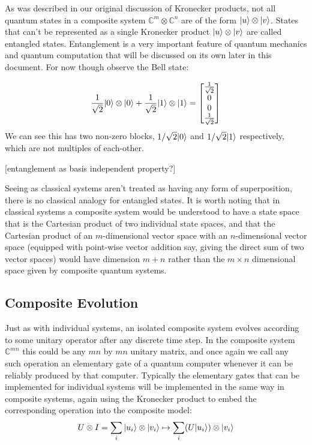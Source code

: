 As was described in our original discussion of Kronecker products, not all quantum states in a composite system $\mathbb{C}^m\otimes\mathbb{C}^n$ are of the form $| u \rangle\otimes| v \rangle$. States that can't be represented as a single Kronecker product $| u \rangle\otimes| v \rangle$ are called entangled states. Entanglement is a very important feature of quantum mechanics and quantum computation that will be discussed on its own later in this document. For now though observe the Bell state:

\[\frac{1}{\sqrt{2}}| 0 \rangle\otimes| 0 \rangle + \frac{1}{\sqrt{2}}| 1 \rangle\otimes| 1 \rangle = \left[\begin{matrix}
\frac{1}{\sqrt{2}}\\
0\\
0\\
\frac{1}{\sqrt{2}}
\end{matrix}\right]\]
We can see this has two non-zero blocks, $1/\sqrt{2}| 0 \rangle$ and $1/\sqrt{2}| 1 \rangle$ respectively, which are not multiples of each-other.

[entanglement as basis independent property?]

Seeing as classical systems aren't treated as having any form of superposition, there is no classical analogy for entangled states. It is worth noting that in classical systems a composite system would be understood to have a state space that is the Cartesian product of two individual state spaces, and that the Cartesian product of an $m$-dimensional vector space with an $n$-dimensional vector space (equipped with point-wise vector addition say, giving the direct sum of two vector spaces) would have dimension $m+n$ rather than the $m\times n$ dimensional space given by composite quantum systems.
\subsection{Composite Evolution}
Just as with individual systems, an isolated composite system evolves according to some unitary operator after any discrete time step. In the composite system $\mathbb{C}^{mn}$ this could be any $mn$ by $mn$ unitary matrix, and once again we call any such operation an elementary gate of a quantum computer whenever it can be reliably produced by that computer. Typically the elementary gates that can be implemented for individual systems will be implemented in the same way in composite systems, again using the Kronecker product to embed the corresponding operation into the composite model:
\[U \otimes I = \sum_i | u_i \rangle\otimes| v_i \rangle \mapsto \sum_i (U| u_i \rangle)\otimes | v_i \rangle\]

